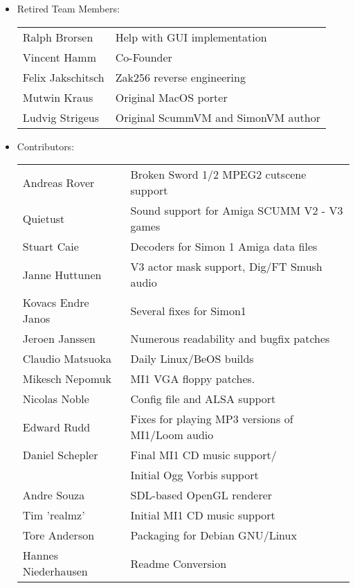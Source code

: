 \begin{itemize}
\begin{tabular}[h]{ll}
  \end{tabular}
\item Retired Team Members:\\
  \begin{tabular}[h]{ll}
    Ralph Brorsen        & Help with GUI implementation\\
    Vincent Hamm         & Co-Founder\\
    Felix Jakschitsch    & Zak256 reverse engineering\\
    Mutwin Kraus         & Original MacOS porter\\
    Ludvig Strigeus      & Original ScummVM and SimonVM author\\
  \end{tabular}
\item Contributors:\\
  \begin{tabular}{ll}
    Andreas Rover        & Broken Sword 1/2 MPEG2 cutscene support\\
    Quietust             & Sound support for Amiga SCUMM V2 - V3 games\\
    Stuart Caie          & Decoders for Simon 1 Amiga data files\\
    Janne Huttunen       & V3 actor mask support, Dig/FT Smush audio\\
    Kovacs Endre Janos   & Several fixes for Simon1\\
    Jeroen Janssen       & Numerous readability and bugfix patches\\
    Claudio Matsuoka     & Daily Linux/BeOS builds \\
    Mikesch Nepomuk      & MI1 VGA floppy patches.\\
    Nicolas Noble        & Config file and ALSA support\\
    Edward Rudd          & Fixes for playing MP3 versions of MI1/Loom audio\\
    Daniel Schepler      & Final MI1 CD music support/\\
                         & Initial Ogg Vorbis support\\
    Andre Souza          & SDL-based OpenGL renderer\\
    Tim 'realmz'         & Initial MI1 CD music support\\
    Tore Anderson        & Packaging for Debian GNU/Linux\\
    Hannes Niederhausen  & Readme Conversion\\
  \end{tabular}\\

\end{itemize}
